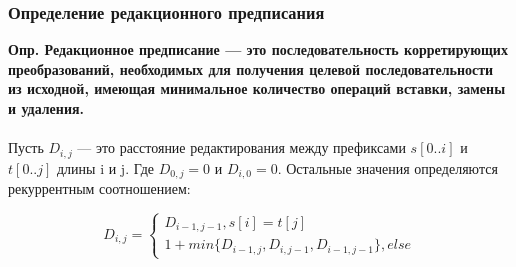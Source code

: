 \documentclass[10pt]{beamer}
\begin{document}
\begin{frame}
\frametitle{Определение редакционного предписания}
\justifying
\begin{small}




\textbf{Опр. Редакционное предписание --- это последовательность корретирующих преобразований, необходимых для получения целевой последовательности из исходной, имеющая минимальное количество операций вставки, замены и удаления.}
~\\
~\\
Пусть  $ D_{i,j} $ --- это расстояние редактирования между префиксами $s[0..i]$ и $t[0..j]$ длины i и j. Где $ D_{0, j} = 0 $ и $D_{i, 0} = 0$. Остальные значения определяются рекуррентным соотношением:

\begin{equation*}
    D_{i, j} = \begin{cases}
      D_{i-1, j-1}, s[i]=t[j] \\
      1 + min⁡\{D_{i-1,j}, D_{i, j-1}, D_{i-1, j-1}\}, else 
    \end{cases}
\end{equation*}


\end{small}
\end{frame}
\end{document}
